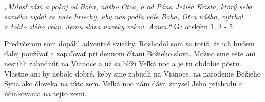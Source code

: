 








{\it „Milosť vám a pokoj od Boha, nášho Otca, a od Pána Ježiša Krista, ktorý seba samého vydal za naše hriechy, aby nás podľa vôle Boha, Otca nášho, vytrhol z~tohto zlého veku. Jemu sláva naveky vekov. Amen.“} Galatským 1, 3 - 5

Predvčerom som dopálil adventné sviečky. Rozhodol som sa totiž, že ich budem ďalej používať a zapaľovať pri dennom čítaní Božieho slova. Možno sme ešte ani nestihli zabudnúť na Vianoce a už sa blíži Veľká noc a je tu obdobie pôstu. Vlastne ani by nebolo dobré, keby sme zabudli na Vianoce, na narodenie Božieho Syna ako človeka na túto zem. Veľká noc nám dáva zmysel Jeho príchodu a účinkovania na tejto zemi.

